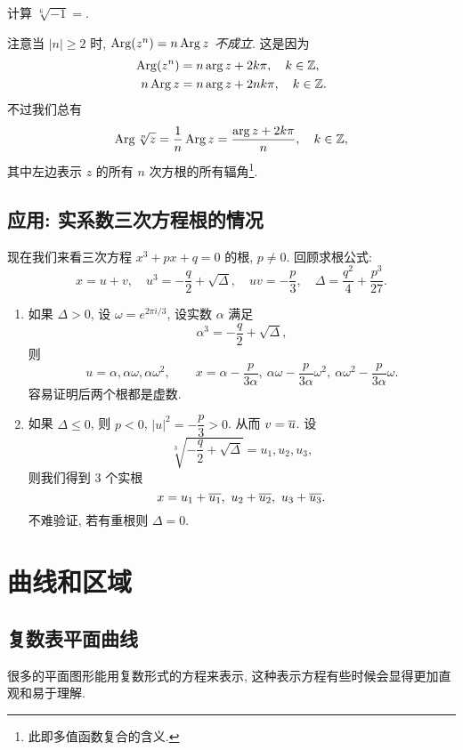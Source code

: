 \begin{exercise}
  计算 $\sqrt[6]{-1}=$\fillblank[12em]{}.
\end{exercise}

注意当 $|n|\ge 2$ 时, \emph{$\operatorname{Arg}(z^n)=n\operatorname{Arg} z$ 不成立}.
这是因为
  \begin{align*}
    \operatorname{Arg}(z^n)&=n\arg z+2k\pi,\quad k\in{\mathbb{Z}},\\
    n\operatorname{Arg} z&=n\arg z+2nk\pi,\quad k\in{\mathbb{Z}}.
  \end{align*}
不过我们总有
  \[\operatorname{Arg} \sqrt[n]z=\dfrac1n\operatorname{Arg} z=\dfrac{\arg z+2k\pi}n,\quad k\in{\mathbb{Z}},\]
其中左边表示 $z$ 的所有 $n$ 次方根的所有辐角\footnote{此即多值函数复合的含义.}.


\subsection{应用: 实系数三次方程根的情况}
现在我们来看三次方程 $x^3+px+q=0$ 的根, $p\neq 0$.
回顾求根公式:
  \[x=u+v,\quad u^3=-\frac q2+\sqrt{\Delta},\quad uv=-\frac p3,\quad \Delta=\frac{q^2}4+\frac{p^3}{27}.\]
\begin{enumerate}
  \item 如果 $\Delta>0$, 设 $\omega=e^{2\pi i/3}$, 设实数 $\alpha$ 满足
    \[\alpha^3=-\frac q2+\sqrt{\Delta},\]
  则
    \[
      u=\alpha,\alpha\omega,\alpha\omega^2,\qquad
      x=\alpha-\frac p{3\alpha},\ 
        \alpha\omega-\frac p{3\alpha} \omega^2,\ 
        \alpha\omega^2-\frac p{3\alpha} \omega.
    \]
    容易证明后两个根都是虚数.
  \item 如果 $\Delta\le 0$, 则 $p<0$, $|u|^2=-\dfrac p3>0$. 从而 $v=\overline u$.
    设
      \[\sqrt[3]{-\frac q2+\sqrt{\Delta}}=u_1,u_2,u_3,\]
    则我们得到 $3$ 个实根
      \[x=u_1+\ov{u_1},\ u_2+\ov{u_2},\ u_3+\ov{u_3}.\]
    不难验证, 若有重根则 $\Delta=0$.
\end{enumerate}


\section{曲线和区域}

\subsection{复数表平面曲线}

很多的平面图形能用复数形式的方程来表示, 这种表示方程有些时候会显得更加直观和易于理解.

